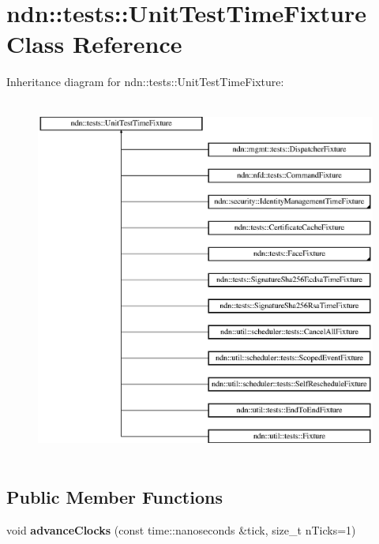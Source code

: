 \hypertarget{classndn_1_1tests_1_1UnitTestTimeFixture}{}\section{ndn\+:\+:tests\+:\+:Unit\+Test\+Time\+Fixture Class Reference}
\label{classndn_1_1tests_1_1UnitTestTimeFixture}
Inheritance diagram for ndn\+:\+:tests\+:\+:Unit\+Test\+Time\+Fixture\+:\begin{figure}[H]
\begin{center}
\leavevmode
\includegraphics[height=12.000000cm]{classndn_1_1tests_1_1UnitTestTimeFixture}
\end{center}
\end{figure}
\subsection*{Public Member Functions}
\begin{DoxyCompactItemize}
\item 
void {\bfseries advance\+Clocks} (const time\+::nanoseconds \&tick, size\+\_\+t n\+Ticks=1)\hypertarget{classndn_1_1tests_1_1UnitTestTimeFixture_a43d1bdb95e192adbe3867cdb07140c17}{}\label{classndn_1_1tests_1_1UnitTestTimeFixture_a43d1bdb95e192adbe3867cdb07140c17}

\end{DoxyCompactItemize}
